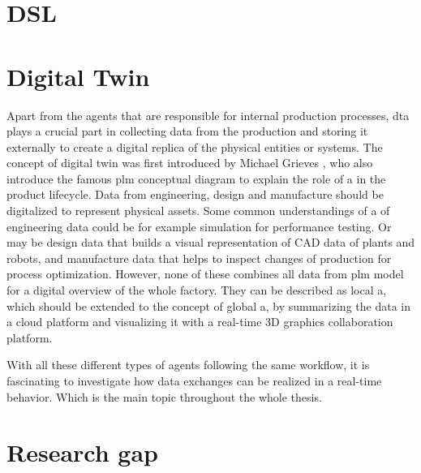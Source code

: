 \section{DSL}

\section{Digital Twin}


Apart from the agents that are responsible for internal production 
processes, \gls{dta} plays a crucial part in collecting data from the 
production and storing it externally to create a digital replica of the 
physical entities or systems. The concept of digital twin was first introduced by Michael Grieves \cite{flumerfelt_complex_2019}, who also introduce the famous \gls{plm} conceptual diagram \cite{greengard_digital_nodate}to explain the role of a in the product lifecycle. Data from engineering, design and manufacture should be digitalized to represent physical assets. Some common understandings of a of engineering data could be for example simulation for performance testing. Or may be design data that builds a visual representation of CAD data of plants and robots, and manufacture data that helps to inspect changes of production for process optimization. However, none of these combines all data from \gls{plm} model for a digital overview of the whole factory. They can be described as local a, which should be extended to the concept of global a, by summarizing the data in a cloud platform and visualizing it with a real-time 3D graphics collaboration platform. 



With all these different types of agents following the same workflow, it is fascinating to investigate how data exchanges can be realized in a real-time behavior. Which is the main topic throughout the whole thesis.


\section{Research gap}
